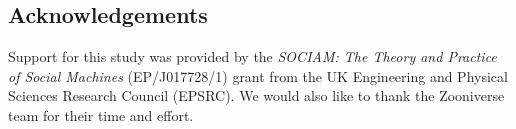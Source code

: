 \documentclass{sigchi}
\begin{document}
\begin{spacing}{0.97}




\section{Acknowledgements}

Support for this study was provided by the \emph{SOCIAM: The Theory and Practice of Social Machines} (EP/J017728/1) grant from the UK Engineering and Physical Sciences Research Council (EPSRC). We would also like to thank the Zooniverse team for their time and effort.

\balance
\begin{spacing}{0.9}


\end{spacing}

\end{spacing}
\end{document}
